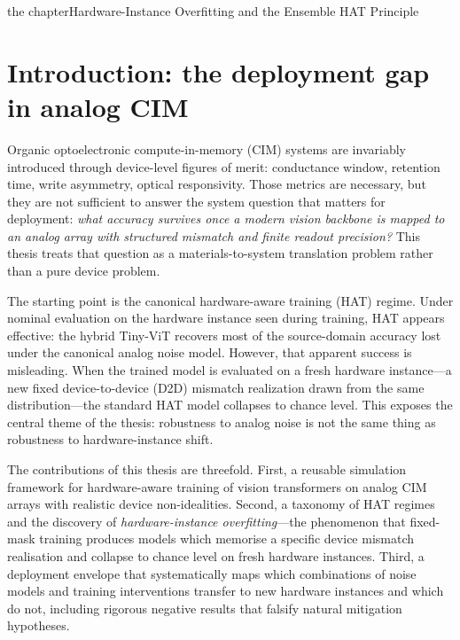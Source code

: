 
the chapter{Hardware-Instance Overfitting and the Ensemble HAT Principle}
\label{chap:hat-instance-overfitting}

\section{Introduction: the deployment gap in analog CIM}

Organic optoelectronic compute-in-memory (CIM) systems are invariably introduced through device-level figures of merit: conductance window, retention time, write asymmetry, optical responsivity.  Those metrics are necessary, but they are not sufficient to answer the system question that matters for deployment: \emph{what accuracy survives once a modern vision backbone is mapped to an analog array with structured mismatch and finite readout precision?}  This thesis treats that question as a materials-to-system translation problem rather than a pure device problem.

The starting point is the canonical hardware-aware training (HAT) regime.  Under nominal evaluation on the hardware instance seen during training, HAT appears effective: the hybrid Tiny-ViT recovers most of the source-domain accuracy lost under the canonical analog noise model.  However, that apparent success is misleading.  When the trained model is evaluated on a fresh hardware instance---a new fixed device-to-device (D2D) mismatch realization drawn from the same distribution---the standard HAT model collapses to chance level.  This exposes the central theme of the thesis: robustness to analog noise is not the same thing as robustness to hardware-instance shift.

The contributions of this thesis are threefold.  First, a reusable simulation framework for hardware-aware training of vision transformers on analog CIM arrays with realistic device non-idealities.  Second, a taxonomy of HAT regimes and the discovery of \emph{hardware-instance overfitting}---the phenomenon that fixed-mask training produces models which memorise a specific device mismatch realisation and collapse to chance level on fresh hardware instances.  Third, a deployment envelope that systematically maps which combinations of noise models and training interventions transfer to new hardware instances and which do not, including rigorous negative results that falsify natural mitigation hypotheses.

